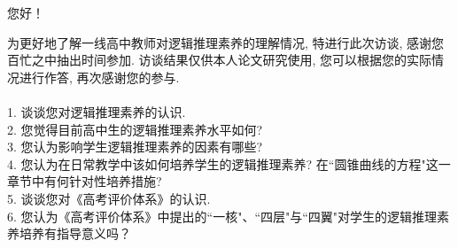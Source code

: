 您好！

为更好地了解一线高中教师对逻辑推理素养的理解情况, 特进行此次访谈, 感谢您百忙之中抽出时间参加. 访谈结果仅供本人论文研究使用, 您可以根据您的实际情况进行作答, 再次感谢您的参与.\\
\\
1.	谈谈您对逻辑推理素养的认识.\\
2.	您觉得目前高中生的逻辑推理素养水平如何?\\
3.	您认为影响学生逻辑推理素养的因素有哪些?\\
4.	您认为在日常教学中该如何培养学生的逻辑推理素养? 在``圆锥曲线的方程"这一章节中有何针对性培养措施?\\
5.	谈谈您对《高考评价体系》的认识.\\
6.	您认为《高考评价体系》中提出的``一核"、``四层"与``四翼"对学生的逻辑推理素养培养有指导意义吗？



 
